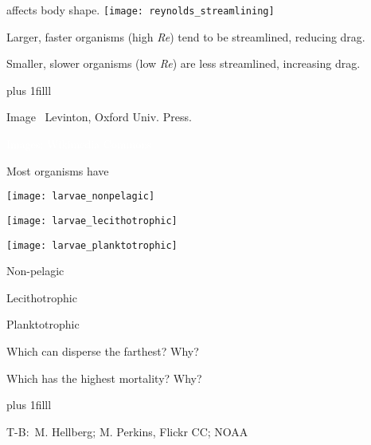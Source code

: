 \documentclass[t,handout]{beamer}  %
\begin{document}
\begin{frame}[t]{ affects body shape.}
	\texttt{[image: reynolds\_streamlining]}
	\begin{multicols}{2}
		\hangpara Larger, faster organisms (high \textit{Re}) tend to be streamlined, reducing drag.

		\columnbreak

		\hangpara Smaller, slower organisms (low \textit{Re}) are less streamlined, increasing drag.

	\end{multicols}

\vskip0pt plus 1filll

\tiny Image \textcopyright\, Levinton, Oxford Univ. Press.
\end{frame}

{
\begin{frame}[b]
\hspace*{60mm}\tiny\textcolor{white}{Images: Wikimedia Commons}
\end{frame}
}

\begin{frame}[t]{Most organisms have }
	\begin{multicols}{2}

	\begin{center}
		\texttt{[image: larvae\_nonpelagic]}
		
		\texttt{[image: larvae\_lecithotrophic]}

		\texttt{[image: larvae\_planktotrophic]}
	\end{center}	
	\columnbreak
	
		Non-pelagic
		
		Lecithotrophic
		
		Planktotrophic
		
		\vspace*{\baselineskip}
		
		Which can disperse the farthest? Why?		
		
		\vspace*{\baselineskip}
		
		Which has the highest mortality? Why?
	
	\end{multicols}
	
	\vskip0pt plus 1filll
	
	\tiny T-B: \textcopyright\,M. Hellberg; M. Perkins, Flickr CC; NOAA
\end{frame}
\end{document}
